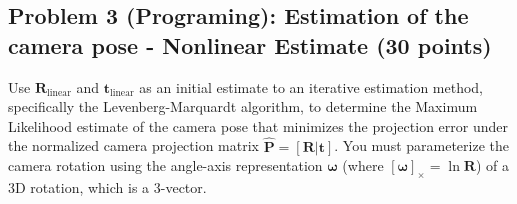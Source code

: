 \documentclass[11pt]{article}
\begin{document}
    \subsection{Problem 3 (Programing): Estimation of the camera pose -
Nonlinear Estimate (30
points)}\label{problem-3-programing-estimation-of-the-camera-pose---nonlinear-estimate-30-points}

Use \(\boldsymbol{R}_\text{linear}\) and
\(\boldsymbol{t}_\text{linear}\) as an initial estimate to an iterative
estimation method, specifically the Levenberg-Marquardt algorithm, to
determine the Maximum Likelihood estimate of the camera pose that
minimizes the projection error under the normalized camera projection
matrix \(\hat{\boldsymbol{P}} =  [\boldsymbol{R} | \boldsymbol{t}]\).
You must parameterize the camera rotation using the angle-axis
representation \(\boldsymbol{\omega}\) (where
\([\boldsymbol{\omega}]_\times = \ln \boldsymbol{R}\)) of a 3D rotation,
which is a 3-vector.
\end{document}
